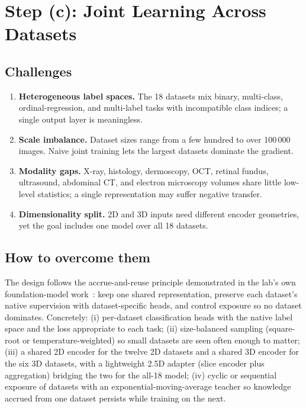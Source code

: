 \documentclass[11pt,a4paper]{article}
\begin{document}
\section{Step (c): Joint Learning Across Datasets}

\subsection{Challenges}

\begin{enumerate}[nosep]
    \item \textbf{Heterogeneous label spaces.} The 18 datasets mix binary,
    multi-class, ordinal-regression, and multi-label tasks with incompatible
    class indices; a single output layer is meaningless.
    \item \textbf{Scale imbalance.} Dataset sizes range from a few hundred to
    over 100\,000 images. Naive joint training lets the largest datasets
    dominate the gradient.
    \item \textbf{Modality gaps.} X-ray, histology, dermoscopy, OCT, retinal
    fundus, ultrasound, abdominal CT, and electron microscopy volumes share
    little low-level statistics; a single representation may suffer negative
    transfer.
    \item \textbf{Dimensionality split.} 2D and 3D inputs need different
    encoder geometries, yet the goal includes one model over all 18 datasets.
\end{enumerate}

\subsection{How to overcome them}

The design follows the accrue-and-reuse principle demonstrated in the lab's
own foundation-model work~\cite{arkplus,ark}: keep one shared representation,
preserve each dataset's native supervision with dataset-specific heads, and
control exposure so no dataset dominates. Concretely: (i) per-dataset
classification heads with the native label space and the loss appropriate to
each task; (ii) size-balanced sampling (square-root or temperature-weighted)
so small datasets are seen often enough to matter; (iii) a shared 2D encoder
for the twelve 2D datasets and a shared 3D encoder for the six 3D datasets,
with a lightweight 2.5D adapter (slice encoder plus aggregation) bridging the
two for the all-18 model; (iv) cyclic or sequential exposure of datasets with
an exponential-moving-average teacher so knowledge accrued from one dataset
persists while training on the next.
\end{document}
